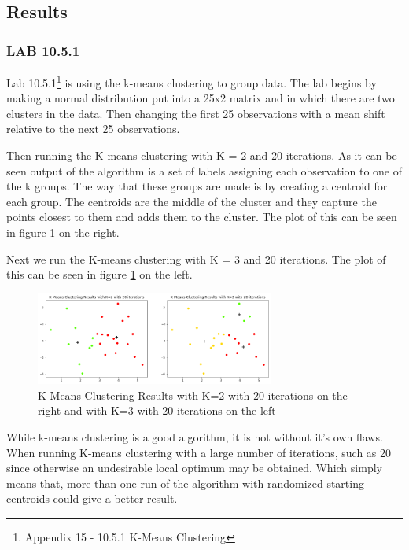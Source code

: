 \subsection{Results}
\subsubsection*{LAB 10.5.1}
Lab 10.5.1\footnote{Appendix 15 - 10.5.1 K-Means Clustering} is using the k-means clustering to group data. The lab begins by making a normal distribution put into a 25x2 matrix and in which there are two clusters in the data. Then changing the first 25 observations with a mean shift relative to the next 25 observations.

Then running the K-means clustering with K = 2 and 20 iterations. As it can be seen output of the algorithm is a set of labels assigning each observation to one of the k groups. The way that these groups are made is by creating a centroid for each group. The centroids are the middle of the cluster and they capture the points closest to them and adds them to the cluster. The plot of this can be seen in figure \ref{fig:kmeansclusteringk2_20Iteration} on the right.

Next we run the K-means clustering with K = 3 and 20 iterations. The plot of this can be seen in figure \ref{fig:kmeansclusteringk2_20Iteration} on the left.

\begin{figure}[H]
	\centering
	\includegraphics[width=0.7\textwidth]{clusteringMethods/kmeansclustering/fig/k-mean.png}
	\caption{K-Means Clustering Results with K=2 with 20 iterations on the right and  with K=3 with 20 iterations on the left}
	\label{fig:kmeansclusteringk2_20Iteration}
\end{figure}

While k-means clustering is a good algorithm, it is not without it's own flaws. When running K-means clustering with a large number of iterations, such as 20 since otherwise an undesirable local optimum may be obtained. Which simply means that, more than one run of the algorithm with randomized starting centroids could give a better result.



